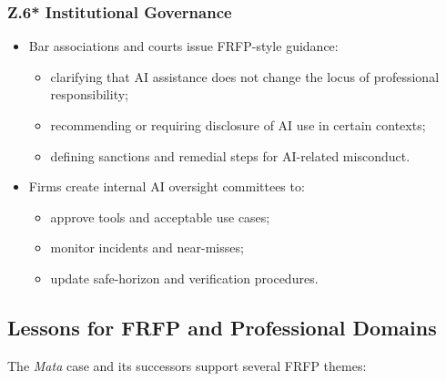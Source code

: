 \subsubsection*{Z.6* Institutional Governance}

\begin{itemize}
  \item Bar associations and courts issue FRFP-style guidance:
        \begin{itemize}
          \item clarifying that AI assistance does not change the locus of
                professional responsibility;
          \item recommending or requiring disclosure of AI use in certain
                contexts;
          \item defining sanctions and remedial steps for AI-related
                misconduct.
        \end{itemize}
  \item Firms create internal AI oversight committees to:
        \begin{itemize}
          \item approve tools and acceptable use cases;
          \item monitor incidents and near-misses;
          \item update safe-horizon and verification procedures.
        \end{itemize}
\end{itemize}

\subsection{Lessons for FRFP and Professional Domains}

The \emph{Mata} case and its successors support several FRFP themes:

